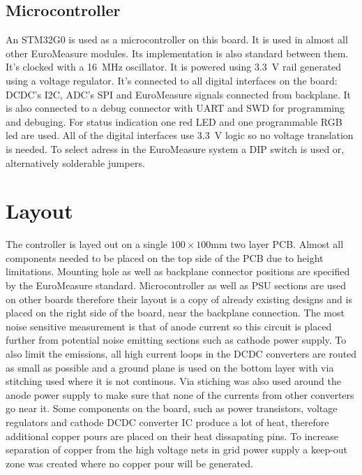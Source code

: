 \documentclass{article}
\begin{document}
\subsection{Microcontroller}
An STM32G0 is used as a microcontroller on this board. It is used in almost all other EuroMeasure modules. Its implementation is also standard between them. It's clocked with a \SI{16}{\mega\hertz} oscillator.
It is powered using \SI{3.3}{\volt} rail generated using a voltage regulator. It's connected to all digital interfaces on the board: DCDC's I2C, ADC's SPI and EuroMeasure signals connected from backplane.
It is also connected to a debug connector with UART and SWD for programming and debuging. For status indication one red LED and one programmable RGB led are used.
All of the digital interfaces use \SI{3.3}{\volt} logic so no voltage translation is needed. To select adress in the EuroMeasure system a DIP switch is used or, alternatively solderable jumpers.




\section{Layout}
The controller is layed out on a single $100\times100\si{\milli\meter}$ two layer PCB.
Almost all components needed to be placed on the top side of the PCB due to height limitations.
Mounting hole as well as backplane connector positions are specified by the EuroMeasure standard.
Microcontroller as well as PSU sections are used on other boards therefore their layout is a copy of already existing designs and is placed on the right side of the board, near the backplane connection.
The most noise sensitive measurement is that of anode current so this circuit is placed further from potential noise emitting sections such as cathode power supply.
To also limit the emissions, all high current loops in the DCDC converters are routed as small as possible and a ground plane is used on the bottom layer with via stitching used where it is not continous.
Via stiching was also used around the anode power supply to make sure that none of the currents from other converters go near it.
Some components on the board, such as power transistors, voltage regulators and cathode DCDC converter IC produce a lot of heat, therefore additional copper pours are placed on their heat dissapating pins.
To increase separation of copper from the high voltage nets in grid power supply a keep-out zone was created where no copper pour will be generated.
\end{document}
